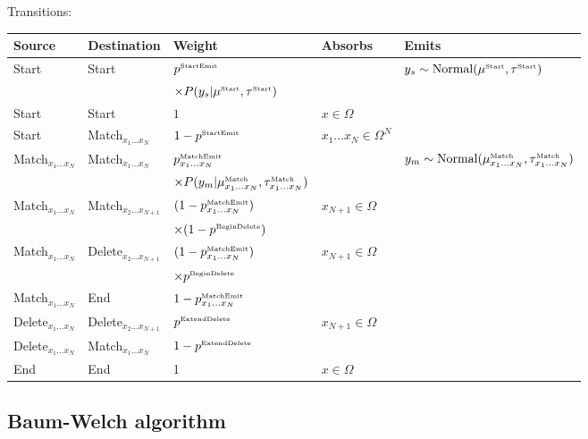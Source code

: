 \documentclass[10pt]{article}
\begin{document}
\noindent Transitions:
\\
\noindent
\begin{tabular}{lllll}
\hline
Source & Destination & Weight & Absorbs & Emits \\
\hline
Start & Start & $p^{\mbox{\tiny StartEmit}}$ & & $y_s \sim \mbox{Normal}(\mu^{\mbox{\tiny Start}},\tau^{\mbox{\tiny Start}})$ \\
& & $\times P(y_s|\mu^{\mbox{\tiny Start}},\tau^{\mbox{\tiny Start}})$ & & \\
Start & Start & $1$ & $x \in \Omega$ & \\
Start & Match${}_{x_1 \ldots x_N}$ & $1 - p^{\mbox{\tiny StartEmit}}$ & $x_1 \ldots x_N \in \Omega^N$ & \\
Match${}_{x_1 \ldots x_N}$ & Match${}_{x_1 \ldots x_N}$ & ${p^{\mbox{\tiny MatchEmit}}_{x_1\ldots x_N}}$ & & $y_m \sim \mbox{Normal}(\mu^{\mbox{\tiny Match}}_{x_1\ldots x_N},\tau^{\mbox{\tiny Match}}_{x_1\ldots x_N})$ \\
& & $\times P(y_m|\mu^{\mbox{\tiny Match}}_{x_1\ldots x_N},\tau^{\mbox{\tiny Match}}_{x_1\ldots x_N})$ & & \\
Match${}_{x_1 \ldots x_N}$ & Match${}_{x_2 \ldots x_{N+1}}$ & $(1 - {p^{\mbox{\tiny MatchEmit}}_{x_1\ldots x_N}})$ & $x_{N+1} \in \Omega$ & \\
& & $\times (1 - p^{\mbox{\tiny BeginDelete}})$ & & \\
Match${}_{x_1 \ldots x_N}$ & Delete${}_{x_2 \ldots x_{N+1}}$ & $(1 - {p^{\mbox{\tiny MatchEmit}}_{x_1\ldots x_N}})$ & $x_{N+1} \in \Omega$ & \\
& & $\times p^{\mbox{\tiny BeginDelete}}$ & & \\
Match${}_{x_1 \ldots x_N}$ & End & $1 - {p^{\mbox{\tiny MatchEmit}}_{x_1\ldots x_N}}$ & & \\
Delete${}_{x_1 \ldots x_N}$ & Delete${}_{x_2 \ldots x_{N+1}}$ & $p^{\mbox{\tiny ExtendDelete}}$ & $x_{N+1} \in \Omega$ & \\
Delete${}_{x_1 \ldots x_N}$ & Match${}_{x_1 \ldots x_N}$ & $1 - p^{\mbox{\tiny ExtendDelete}}$ & & \\
End & End & 1 & $x \in \Omega$ & \\
\hline
\end{tabular}




\subsection{Baum-Welch algorithm}
\end{document}
